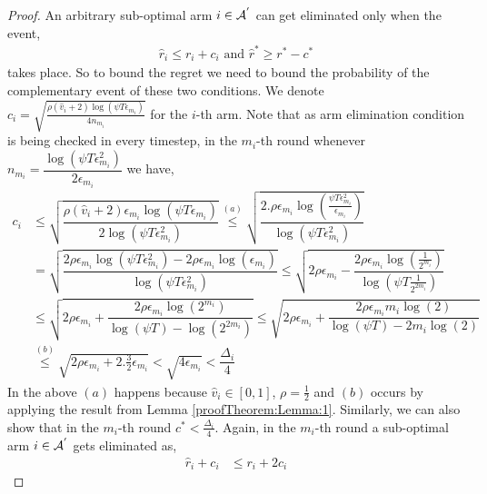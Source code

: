 \begin{proof}
An arbitrary sub-optimal arm ${i}\in \mathcal{A}^{'}$ can get eliminated only when the event,
	\begin{align}
	\hat{r}_{i} \leq r_{i} + c_{i} \text{ and } \label{eq:armelim-casea}
 	\hat{r}^{*} \geq r^{*} - c^{*}
	\end{align}
takes place. So to bound the regret we need to bound the probability of the complementary event of these two conditions. We denote $c_{i} = \sqrt{\frac{\rho (\hat{v}_i + 2) \log (\psi T\epsilon_{m_{i}})}{4 n_{m_i}}}$ for the $i$-th arm. Note that as arm elimination condition is being checked in every timestep, in the $m_i$-th round whenever $n_{m_{i}}=\dfrac{\log{(\psi T\epsilon_{m_{i}}^{2})}}{2\epsilon_{m_{i}}}$ we have, 
	\begin{align*}
	c_{i} &\leq \sqrt{\dfrac{\rho (\hat{v}_i + 2)\epsilon_{m_{i}}\log (\psi T\epsilon_{m_{i}})}{2\log(\psi T\epsilon_{m_{i}}^{2})}} \overset{(a)}{\leq} \sqrt{\dfrac{2.\rho\epsilon_{m_{i}}\log (\frac{\psi T\epsilon_{m_{i}}^{2}}{\epsilon_{m_{i}}})}{\log(\psi T\epsilon_{m_{i}}^{2})}} \\
	& = \sqrt{\dfrac{2\rho\epsilon_{m_{i}}\log (\psi T\epsilon_{m_{i}}^{2}) - 2\rho\epsilon_{m_{i}}\log (\epsilon_{m_{i}})}{\log(\psi T\epsilon_{m_{i}}^{2})}} 
	\leq  \sqrt{2\rho\epsilon_{m_{i}} - \dfrac{2\rho\epsilon_{m_i}\log(\frac{1}{2^{m_i}})}{\log(\psi T \frac{1}{2^{2m_i}})}} \\
	&\leq \sqrt{2\rho\epsilon_{m_{i}} + \dfrac{2\rho\epsilon_{m_i}\log(2^{m_i})}{\log(\psi T) - \log( 2^{2m_i})}}  \leq \sqrt{2\rho\epsilon_{m_{i}} + \dfrac{2\rho\epsilon_{m_i}m_i \log(2)}{\log(\psi T) - 2m_i\log( 2)}} \\ 
	 & \overset{(b)}{\leq} \sqrt{2\rho\epsilon_{m_{i}} + 2.\frac{3}{2}\epsilon_{m_i}} 
	  < \sqrt{4\epsilon_{m_i}} 
	  < \dfrac{\Delta_{i}}{4} 
	\end{align*}
In the above $(a)$ happens because $\hat{v}_i \in [0,1]$, $\rho =\frac{1}{2}$ and $(b)$ occurs by applying the result from Lemma \ref{proofTheorem:Lemma:1}. Similarly, we can also show that in the $m_i$-th round $c^* < \frac{\Delta_i}{4}$.
Again, in the $m_i$-th round a sub-optimal arm ${i} \in \mathcal{A}^{'}$ gets eliminated as, 
  \begin{align*}
\hat{r}_{i} + c_{i}&\leq r_{i} + 2c_{i} 

\end{align*}
\end{proof}
